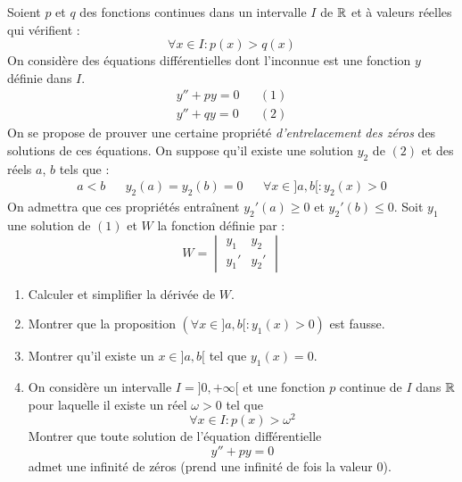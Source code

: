 Soient $p$ et $q$ des fonctions continues dans un intervalle $I$ de $\mathbb{R}$ et à valeurs réelles qui vérifient :
\begin{displaymath}
 \forall x\in I : p(x) > q(x)
\end{displaymath}
On considère des équations différentielles dont l'inconnue est une fonction $y$ définie dans $I$.
\begin{align*}
 y'' + p y =0 & & (1)\\
 y'' + q y =0 & & (2)
\end{align*}
On se propose de prouver une certaine propriété \emph{d'entrelacement des zéros} des solutions de ces équations.\newline
On suppose qu'il existe une solution $y_2$ de $(2)$ et des réels $a$, $b$ tels que :
\begin{align*}
 a<b & & y_2(a)=y_2(b)=0 & & \forall x\in]a,b[ : y_2(x)>0
\end{align*}
On admettra que ces propriétés entraînent $y_2'(a)\geq 0$ et $y_2'(b)\leq 0$.\newline
Soit $y_1$ une solution de $(1)$ et $W$ la fonction définie par :
\begin{displaymath}
 W = 
\begin{vmatrix}
y_1 & y_2 \\
y_1' & y_2'
\end{vmatrix}
\end{displaymath}
\begin{enumerate}
\item Calculer et simplifier la dérivée de $W$.
 \item Montrer que la proposition $\left( \forall x \in ]a,b[ : y_1(x) > 0\right)$ est fausse.
\item Montrer qu'il existe un $x\in]a,b[$ tel que $y_1(x)=0$.
\item On considère un intervalle $I=]0,+\infty[$ et une fonction $p$ continue de $I$ dans $\mathbb{R}$ pour laquelle il existe un réel $\omega>0$ tel que 
\begin{displaymath}
 \forall x\in I : p(x) > \omega^2
\end{displaymath}
 Montrer que toute solution de l'équation différentielle
\begin{displaymath}
 y''+py =0
\end{displaymath}
admet une infinité de zéros (prend une infinité de fois la valeur $0$).
\end{enumerate}
